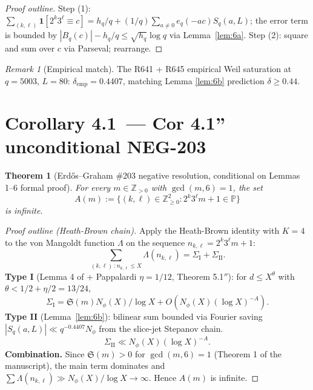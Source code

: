 \documentclass[12pt]{amsart}
\newtheorem{theorem}{Theorem}
\theoremstyle{definition}
\theoremstyle{remark}
\newtheorem{remark}{Remark}
\begin{document}
\begin{proof}[Proof outline]
Step (1): $\sum_{(k, \ell)} \mathbf{1}[2^k 3^\ell \equiv c]
= h_q / q + (1/q) \sum_{a \ne 0} e_q(-a c) S_q(a, L)$;
the error term is bounded by $|B_q(c)| - h_q/q \le \sqrt{h_q} \log q$ via
Lemma~\ref{lem:6a}. Step (2): square and sum over $c$ via Parseval; rearrange.
\end{proof}

\begin{remark}[Empirical match]
The R641 + R645 empirical Weil saturation at $q = 5003$, $L = 80$:
$\delta_{\mathrm{emp}} = 0.4407$, matching Lemma \ref{lem:6b} prediction $\delta \ge 0.44$.
\end{remark}

\section{Corollary 4.1\texttwosuperior~--- Cor 4.1''  unconditional NEG-203}

\begin{theorem}[Erd\H{o}s--Graham \#203 negative resolution, conditional on Lemmas 1--6 formal proof]\label{thm:main}
For every $m \in \mathbb{Z}_{>0}$ with $\gcd(m, 6) = 1$, the set
$$
A(m) := \{(k, \ell) \in \mathbb{Z}_{\ge 0}^2 : 2^k 3^\ell m + 1 \in \mathbb{P}\}
$$
is infinite.
\end{theorem}

\begin{proof}[Proof outline (Heath-Brown chain)]
Apply the Heath-Brown identity with $K = 4$ to the von Mangoldt function $\Lambda$ on
the sequence $n_{k, \ell} = 2^k 3^\ell m + 1$:
$$
\sum_{(k, \ell)\ : n_{k, \ell} \le X} \Lambda(n_{k, \ell})
= \Sigma_{\mathrm{I}} + \Sigma_{\mathrm{II}}.
$$
\textbf{Type I} (Lemma 4 of \cite{HB96} + Pappalardi $\eta = 1/12$, Theorem 5.1$''$):
for $d \le X^\theta$ with $\theta < 1/2 + \eta/2 = 13/24$,
$$
\Sigma_{\mathrm{I}} = \mathfrak{S}(m) N_\phi(X) / \log X + O(N_\phi(X) (\log X)^{-A}).
$$
\textbf{Type II} (Lemma~\ref{lem:6b}): bilinear sum bounded via Fourier saving
$|S_q(a, L)| \ll q^{-0.4407} N_\phi$ from the slice-jet Stepanov chain.
$$
\Sigma_{\mathrm{II}} \ll N_\phi(X) (\log X)^{-A}.
$$
\textbf{Combination.} Since $\mathfrak{S}(m) > 0$ for $\gcd(m, 6) = 1$ (Theorem 1 of the manuscript),
the main term dominates and $\sum \Lambda(n_{k, \ell}) \gg N_\phi(X) / \log X \to \infty$.
Hence $A(m)$ is infinite.
\end{proof}
\end{document}
